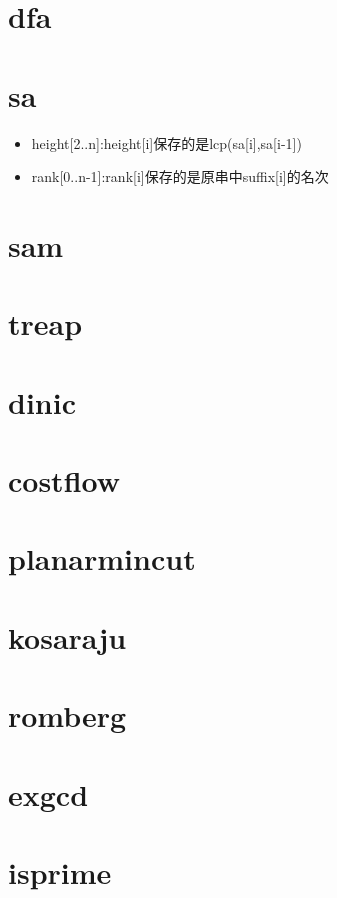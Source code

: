 \documentclass[
	10pt,
	twocolumn,
	a4paper,
]{article}
\begin{document}
\section{dfa}

\section{sa}
\begin{itemize} \setlength{\itemsep}{0pt}
\item height[2..n]:height[i]保存的是lcp(sa[i],sa[i-1])
\item rank[0..n-1]:rank[i]保存的是原串中suffix[i]的名次
\end{itemize}

\section{sam}

\section{treap}


\section{dinic}

\section{costflow}

\section{planarmincut}

\section{kosaraju}


\section{romberg}

\section{exgcd}

\section{isprime}

\end{document}
